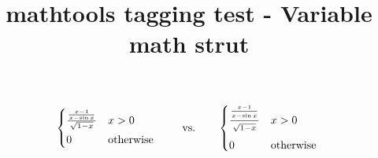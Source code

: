 \documentclass{article}
\title{mathtools tagging test - Variable math strut}
\begin{document}
\[ \begin{cases*}
\frac{ \frac{ x-1 }{ x-\sin x } }{ \sqrt{ 1-x } } & $x>0$ \\
0 & otherwise
\end{cases*}
\qquad\text{vs.}\qquad
\begin{cases*}
\frac{ \frac{ \xmathstrut{0.1} x-1 }
{ \xmathstrut{0.25} x-\sin x } }
{\xmathstrut{0.4} \sqrt{ 1-x } } & $x>0$ \\
0 & otherwise
\end{cases*} \]
\end{document}
